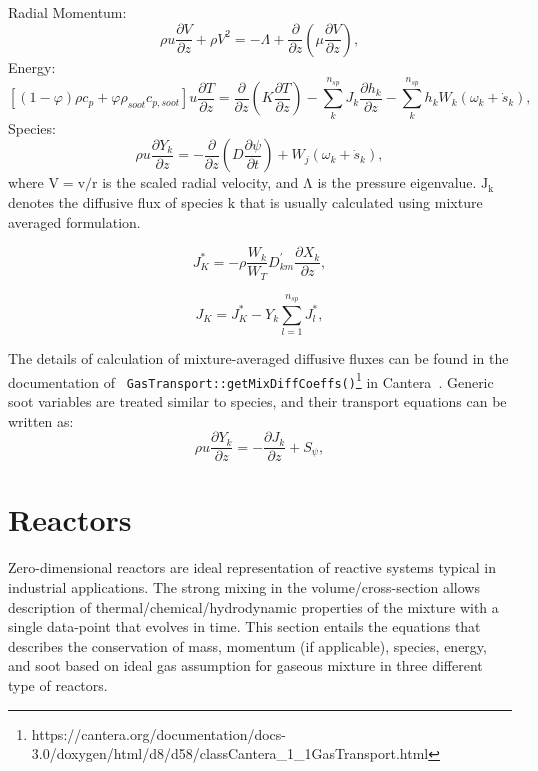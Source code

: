 \noindent Radial Momentum:
\begin{equation}
	\rho u\frac{\partial V}{\partial z} + \rho V^2=-\Lambda +
	\frac{\partial}{\partial z}
	\left(
		\mu \frac{\partial V}{\partial z}
	\right)
	\label{eqn:flame_momen},
\end{equation}
\noindent Energy:
\begin{equation}
	\left[
		(1-\varphi)\rho c_p
		+\varphi\rho_{soot} c_{p,soot}
	\right] u
	\frac{\partial T}{\partial z} = 	\frac{\partial}{\partial z}
	\left(
	K \frac{\partial T}{\partial z}
	\right)
	-\sum_{k}^{n_{sp}} J_k \frac{\partial h_k}{\partial z}
	-\sum_{k}^{n_{sp}} h_k W_k
	\left(
		\omega_k+\dot{s}_k
	\right)
	\label{eqn:flame_energy},
\end{equation}
\noindent Species:
\begin{equation}
	\rho u\frac{\partial Y_k}{\partial z} = 
	-\frac{\partial}{\partial z}
	\left(
	D \frac{\partial \psi}{\partial t}
	\right)
	+ W_j 
	\left(
	\omega_k+\dot{s}_k
	\right)
	\label{eqn:flame_species},
\end{equation}
\noindent where $\mathrm{V=v/r}$ is the scaled radial velocity, and $\mathrm{\Lambda}$ is the pressure eigenvalue. $\mathrm{J_k}$ denotes the diffusive flux of species $\mathrm{k}$ that is usually calculated using mixture averaged formulation.

\begin{equation}
	J^*_K = -\rho \frac{W_k}{W_T}D^{'}_{km}
	\frac{\partial X_k}{\partial z}
	\label{eqn:diffflux_star},
\end{equation}

\begin{equation}
	J_K = J^*_K - Y_k \sum_{l=1}^{n_{sp}} J^*_l
	\label{eqn:diffflux},
\end{equation}

The details of calculation of mixture-averaged diffusive fluxes can be found in the documentation of \verb| GasTransport::getMixDiffCoeffs()|\footnote[1]{https://cantera.org/documentation/docs-3.0/doxygen/html/d8/d58/classCantera\_1\_1GasTransport.html} in Cantera~\citep{cantera}. Generic soot variables are treated similar to species, and their transport equations can be written as:
\begin{equation}
	\rho u\frac{\partial Y_k}{\partial z} = 
	-\frac{\partial J_k}{\partial z}
	+ S_{\psi} 
	\label{eqn:flame_soot},
\end{equation}


\section{Reactors}
Zero-dimensional reactors are ideal representation of reactive systems typical in industrial applications. The strong mixing in the volume/cross-section allows description of thermal/chemical/hydrodynamic properties of the mixture with a single data-point that evolves in time. This section entails the equations that describes the conservation of mass, momentum (if applicable), species, energy, and soot based on ideal gas assumption for gaseous mixture in three different type of reactors.
